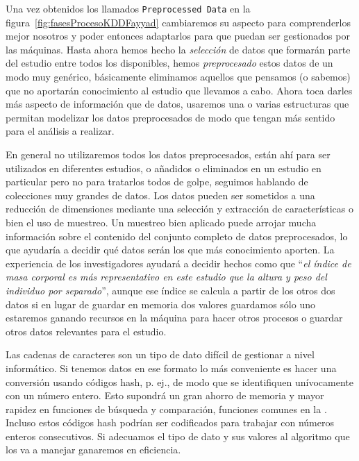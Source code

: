 
Una vez obtenidos los llamados \texttt{Preprocessed Data} en la figura~\ref{fig:fasesProcesoKDDFayyad} cambiaremos su aspecto para comprenderlos mejor nosotros y poder entonces adaptarlos para que puedan ser gestionados por las máquinas. Hasta ahora hemos hecho la \emph{selección} de datos que formarán parte del estudio entre todos los disponibles, hemos \emph{preprocesado} estos datos de un modo muy genérico, básicamente eliminamos aquellos que pensamos (o sabemos) que no aportarán conocimiento al estudio que llevamos a cabo. Ahora toca darles más aspecto de información que de datos, usaremos una o varias estructuras que permitan modelizar los datos preprocesados de modo que tengan más sentido para el análisis a realizar.

En general no utilizaremos todos los datos preprocesados, están ahí para ser utilizados en diferentes estudios, o añadidos o eliminados en un estudio en particular pero no para tratarlos todos de golpe, seguimos hablando de colecciones muy grandes de datos. Los datos pueden ser sometidos a una reducción de dimensiones mediante una selección y extracción de características o bien el uso de muestreo. Un muestreo bien aplicado puede arrojar mucha información sobre el contenido del conjunto completo de datos preprocesados, lo que ayudaría a decidir qué datos serán los que más conocimiento aporten. La experiencia de los investigadores ayudará a decidir hechos como que "`\emph{el índice de masa corporal es más representativo en este estudio que la altura y peso del individuo por separado}"', aunque ese índice se calcula a partir de los otros dos datos si en lugar de guardar en memoria dos valores guardamos sólo uno estaremos ganando recursos en la máquina para hacer otros procesos o guardar otros datos relevantes para el estudio.

Las cadenas de caracteres son un tipo de dato difícil de gestionar a nivel informático. Si tenemos datos en ese formato lo más conveniente es hacer una conversión usando códigos hash, p. ej., de modo que se identifiquen unívocamente con un número entero. Esto supondrá un gran ahorro de memoria y mayor rapidez en funciones de búsqueda y comparación, funciones comunes en la \DM. Incluso estos códigos hash podrían ser codificados para trabajar con números enteros consecutivos. Si adecuamos el tipo de dato y sus valores al algoritmo que los va a manejar ganaremos en eficiencia.

